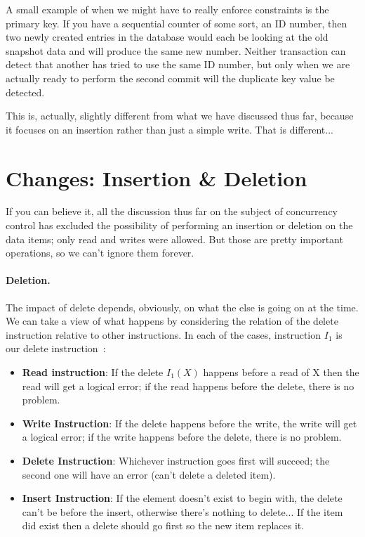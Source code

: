 A small example of when we might have to really enforce constraints is the primary key. If you have a sequential counter of some sort, an ID number, then two newly created entries in the database would each be looking at the old snapshot data and will produce the same new number. Neither transaction can detect that another has tried to use the same ID number, but only when we are actually ready to perform the second commit will the duplicate key value be detected.

This is, actually, slightly different from what we have discussed thus far, because it focuses on an insertion rather than just a simple write. That is different...

\section*{Changes: Insertion \& Deletion}

If you can believe it, all the discussion thus far on the subject of concurrency control has excluded the possibility of performing an insertion or deletion on the data items; only read and writes were allowed. But those are pretty important operations, so we can't ignore them forever. 

\paragraph{Deletion.} The impact of delete depends, obviously, on what the else is going on at the time. We can take a view of what happens by considering the relation of the delete instruction relative to other instructions. In each of the cases, instruction $I_{1}$ is our delete instruction~\cite{dsc}:

\begin{itemize}
	\item \textbf{Read instruction}: If the delete $I_{1}(X)$ happens before a read of X then the read will get a logical error; if the read happens before the delete, there is no problem.
	\item \textbf{Write Instruction}: If the delete happens before the write, the write will get a logical error; if the write happens before the delete, there is no problem.
	\item \textbf{Delete Instruction}: Whichever instruction goes first will succeed; the second one will have an error (can't delete a deleted item).
	\item \textbf{Insert Instruction}: If the element doesn't exist to begin with, the delete can't be before the insert, otherwise there's nothing to delete... If the item did exist then a delete should go first so the new item replaces it.
\end{itemize}

